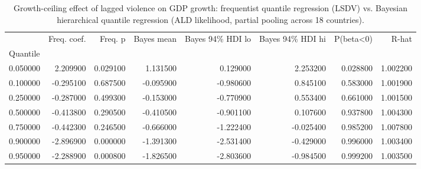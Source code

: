 \begin{table}
\caption{Growth-ceiling effect of lagged violence on GDP growth: frequentist quantile regression (LSDV) vs. Bayesian hierarchical quantile regression (ALD likelihood, partial pooling across 18 countries).}
\label{tab:growth_ceiling_bayesian}
\begin{tabular}{lrrrrrrr}
\toprule
 & Freq. coef. & Freq. p & Bayes mean & Bayes 94\% HDI lo & Bayes 94\% HDI hi & P(beta<0) & R-hat \\
Quantile &  &  &  &  &  &  &  \\
\midrule
0.050000 & 2.209900 & 0.029100 & 1.131500 & 0.129000 & 2.253200 & 0.028800 & 1.002200 \\
0.100000 & -0.295100 & 0.687500 & -0.095900 & -0.980600 & 0.845100 & 0.583000 & 1.001900 \\
0.250000 & -0.287000 & 0.499300 & -0.153000 & -0.770900 & 0.553400 & 0.661000 & 1.001500 \\
0.500000 & -0.413800 & 0.290500 & -0.410500 & -0.901100 & 0.107600 & 0.937800 & 1.004300 \\
0.750000 & -0.442300 & 0.246500 & -0.666000 & -1.222400 & -0.025400 & 0.985200 & 1.007800 \\
0.900000 & -2.896900 & 0.000000 & -1.391300 & -2.531400 & -0.429000 & 0.996000 & 1.003400 \\
0.950000 & -2.288900 & 0.000800 & -1.826500 & -2.803600 & -0.984500 & 0.999200 & 1.003500 \\
\bottomrule
\end{tabular}
\end{table}
